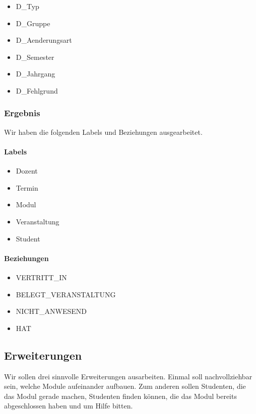 \begin{itemize}
	\item D\_Typ
	\item D\_Gruppe
	\item D\_Aenderungsart
	\item D\_Semester
	\item D\_Jahrgang
	\item D\_Fehlgrund	
\end{itemize}

\vspace{12pt}

\subsubsection{Ergebnis}
Wir haben die folgenden Labels und Beziehungen ausgearbeitet.

\vspace{6pt}

\paragraph{Labels}
\begin{itemize}
	\item Dozent
	\item Termin
	\item Modul
	\item Veranstaltung
	\item Student
\end{itemize}

\vspace{6pt}

\paragraph{Beziehungen}
\begin{itemize}
	\item VERTRITT\_IN
	\item BELEGT\_VERANSTALTUNG
	\item NICHT\_ANWESEND
	\item HAT
\end{itemize}

\newpage

\subsection{Erweiterungen}
Wir sollen drei sinnvolle Erweiterungen ausarbeiten. Einmal soll nachvollziehbar sein, welche Module aufeinander aufbauen. Zum anderen sollen Studenten, die das Modul gerade machen, Studenten finden können, die das Modul bereits abgeschlossen haben und um Hilfe bitten. 

